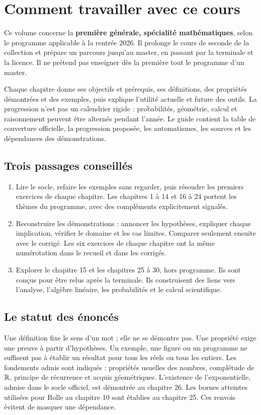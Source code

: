 
\chapter*{Comment travailler avec ce cours}
Ce volume concerne la \textbf{première générale, spécialité mathématiques},
selon le programme applicable à la rentrée 2026. Il prolonge le cours de seconde
de la collection et prépare un parcours jusqu'au master, en passant par la
terminale et la licence. Il ne prétend pas enseigner dès la première tout le
programme d'un master.

Chaque chapitre donne ses objectifs et prérequis, ses définitions, des propriétés
démontrées et des exemples, puis explique l'utilité actuelle et future des outils.
La progression n'est pas un calendrier rigide : probabilités, géométrie, calcul
et raisonnement peuvent être alternés pendant l'année.
Le guide contient la table de couverture officielle, la progression proposée,
les automatismes, les sources et les dépendances des démonstrations.

\section*{Trois passages conseillés}
\begin{enumerate}
\item Lire le socle, refaire les exemples sans regarder, puis résoudre les premiers
exercices de chaque chapitre. Les chapitres 1 à 14 et 16 à 24 portent les thèmes
du programme, avec des compléments explicitement signalés.
\item Reconstruire les démonstrations : annoncer les hypothèses, expliquer chaque
implication, vérifier le domaine et les cas limites. Comparer seulement ensuite
avec le corrigé. Les six exercices de chaque chapitre ont la même numérotation
dans le recueil et dans les corrigés.
\item Explorer le chapitre 15 et les chapitres 25 à 30, hors programme.
Ils sont conçus pour être relus après la terminale. Ils construisent des liens
vers l'analyse, l'algèbre linéaire, les probabilités et le calcul scientifique.
\end{enumerate}

\section*{Le statut des énoncés}
Une définition fixe le sens d'un mot ; elle ne se démontre pas.
Une propriété exige une preuve à partir d'hypothèses.
Un exemple, une figure ou un programme ne suffisent pas à établir un résultat
pour tous les réels ou tous les entiers.
Les fondements admis sont indiqués : propriétés usuelles des nombres,
complétude de $\mathbb{R}$, principe de récurrence et acquis géométriques.
L'existence de l'exponentielle, admise dans le socle officiel, est démontrée
au chapitre 26. Les bornes atteintes utilisées pour Rolle au chapitre 10
sont établies au chapitre 25. Ces renvois évitent de masquer une dépendance.

